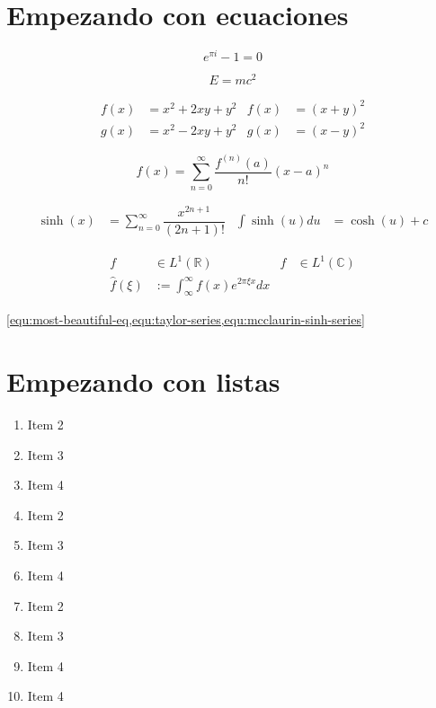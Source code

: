 \documentclass[12pt]{report}
\begin{document}
	\chapter{Empezando con ecuaciones}
		
		\lipsum[1]
		
		
		
		\begin{equation}\label{equ:most-beautiful-eq}
			e^{\pi i} -1 = 0
		\end{equation}
		
		\begin{equation}\label{equ:einstein}
			E = m c^{2}
		\end{equation}
		
		\lipsum[1][1-3]
		
		\begin{align}
			f(x) &= x^{2} + 2xy + y^{2} &
				f(x) &= (x+y)^{2} \\
			g(x) &= x^{2} - 2xy + y^{2} &
				g(x) &= (x-y)^{2}
		\end{align}
		\clearpage
		
		\begin{equation}\label{equ:taylor-series}
			f(x) = \sum_{n=0}^{\infty}{
				\dfrac{f^{(n)}(a)}{n!}(x-a)^{n}
			}
		\end{equation}		
		
		\begin{align} \label{equ:mcclaurin-sinh-series}
			\sinh(x) &= \sum_{n=0}^{\infty}{\dfrac{x^{2n+1}}{(2n+1)!}} &
				\int \sinh(u) du &= \cosh(u) + c
		\end{align}
		
		\begin{align*}
			f &\in L^{1}(\mathbb{R}) & f &\in L^{1}(\mathbb{C})\\
			\hat{f}(\xi) &:= \int_{\infty}^{\infty} f(x) e ^{2\pi\xi x} dx
		\end{align*}
		
		\cref{equ:most-beautiful-eq,equ:taylor-series,equ:mcclaurin-sinh-series}
		
	\chapter{Empezando con listas}
		
		\begin{enumerate}[columns=4]
			\item Item 2
			\item Item 3
			\item Item 4
			\item Item 2
			\item Item 3
			\item Item 4
			\item Item 2
			\item Item 3
			\item Item 4
			\item Item 4
		\end{enumerate}
		
\end{document}
